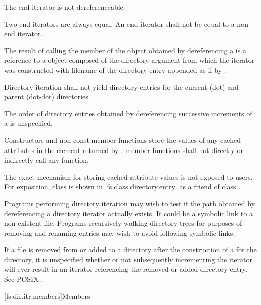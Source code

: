 \pnum
The end iterator is not dereferenceable.

\pnum
Two end iterators are always equal. An end iterator shall not be equal to a non-end
iterator.

\pnum
The result of calling the  member of the  object obtained by dereferencing a  is a reference to a  object composed of the directory argument from which the iterator was
constructed with filename of the directory entry appended as if by .

\pnum
Directory iteration shall not yield directory entries for the current (dot)
and parent (dot-dot) directories.

\pnum
The order of directory entries obtained by dereferencing successive
increments of a  is unspecified.

\pnum
Constructors and non-const  member functions
store the values of any cached attributes
in the  element returned by .
 member functions shall not directly or indirectly call
any   function.
\begin{note}
The exact mechanism for storing cached attribute values is not exposed to users.
For exposition, class  is shown in \ref{fs.class.directory.entry}
as a friend of class .
\end{note}

\pnum
\begin{note}
Programs performing directory iteration may wish to test if the
path obtained by dereferencing a directory iterator actually exists. It could be
a symbolic link to a non-existent file. Programs recursively
walking directory trees for purposes of removing and renaming entries may wish
to avoid following symbolic links.
\end{note}

\pnum
\begin{note}
If a file  is removed from or added to a directory after the
construction of a  for the directory, it is
unspecified whether or not subsequently incrementing the iterator will ever
result in an iterator referencing the removed or added directory entry. See
POSIX .
\end{note}

[fs.dir.itr.members]{Members}

